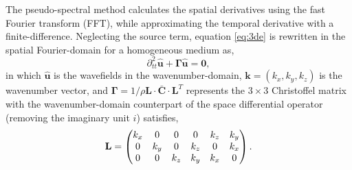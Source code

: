 The pseudo-spectral method calculates the spatial derivatives using the fast Fourier transform
(FFT), while
approximating the temporal derivative with a finite-difference.
Neglecting the source term, equation \ref{eq:3de} is rewritten in the spatial
Fourier-domain for a homogeneous medium as,
\begin{equation}
\label{eq:3deh}
\partial^2_{tt}\hat{\mathbf{u}} + \mathbf{\Gamma}\hat{\mathbf{u}} =
\mathbf{0},
\end{equation}
in which $\hat{\mathbf{u}}$ is the wavefields in the wavenumber-domain,
$\mathbf{k}=(k_x,k_y,k_z)$ is the wavenumber vector, and
$\mathbf{\Gamma}=1/\rho\mathbf{L}\cdot\bar{\mathbf{C}}\cdot\mathbf{L}^{T}$ represents the
$3\times3$  Christoffel matrix with the wavenumber-domain counterpart of the space
differential operator (removing the imaginary unit $i$) satisfies,
\begin{equation}
\label{eq:gradientL}
\mathbf{L}=
\begin{pmatrix}k_x & 0 &0 &0 & k_z & k_y \cr 
               0 & k_y & 0 & k_z &0 & k_x \cr
               0 & 0 & k_z & k_y & k_x &0\end{pmatrix}.
\end{equation}

